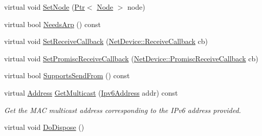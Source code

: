 \begin{DoxyCompactItemize}
\item 
virtual void \hyperlink{classns3_1_1MeshPointDevice_ac63e807b1f104982dee77f323f75e69a}{Set\+Node} (\hyperlink{classns3_1_1Ptr}{Ptr}$<$ \hyperlink{classns3_1_1Node}{Node} $>$ node)
\item 
virtual bool \hyperlink{classns3_1_1MeshPointDevice_afda6456377cc5a4215384a320f1304d7}{Needs\+Arp} () const 
\item 
virtual void \hyperlink{classns3_1_1MeshPointDevice_ab5fefff52512e73365f2ddb8f409cf3c}{Set\+Receive\+Callback} (\hyperlink{classns3_1_1NetDevice_ad5e5e1ca187472bc2ba99575d8def568}{Net\+Device\+::\+Receive\+Callback} cb)
\item 
virtual void \hyperlink{classns3_1_1MeshPointDevice_a3ca31894714a71736a7bfd041da60a95}{Set\+Promisc\+Receive\+Callback} (\hyperlink{classns3_1_1NetDevice_a427225795919f26c414bee2ea3f31ed2}{Net\+Device\+::\+Promisc\+Receive\+Callback} cb)
\item 
virtual bool \hyperlink{classns3_1_1MeshPointDevice_ade4673786f2f0eff1b0f1c11573f97e9}{Supports\+Send\+From} () const 
\item 
virtual \hyperlink{classns3_1_1Address}{Address} \hyperlink{classns3_1_1MeshPointDevice_a0aca6b73801fffd0ca00661a8dfbda7b}{Get\+Multicast} (\hyperlink{classns3_1_1Ipv6Address}{Ipv6\+Address} addr) const 
\begin{DoxyCompactList}\small\item\em Get the M\+AC multicast address corresponding to the I\+Pv6 address provided. \end{DoxyCompactList}\item 
virtual void \hyperlink{classns3_1_1MeshPointDevice_a6a5f293afb71ae4b58d523abccb3229b}{Do\+Dispose} ()
\end{DoxyCompactItemize}
